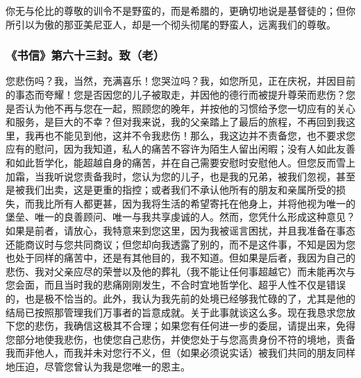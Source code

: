 你无与伦比的尊敬的训令不是野蛮的，而是希腊的，更确切地说是基督徒的；但你所引以为傲的那亚美尼亚人，却是一个彻头彻尾的野蛮人，远离我们的尊敬。\par


\subsubsection{《书信》第六十三封。致（老）}

\par

您悲伤吗？我，当然，充满喜乐！您哭泣吗？我，如您所见，正在庆祝，并因目前的事态而夸耀！您是否因您的儿子被取走，并因他的德行而被提升尊荣而悲伤？您是否认为他不再与您在一起，照顾您的晚年，并按他的习惯给予您一切应有的关心和服务，是巨大的不幸？但对我来说，我的父亲踏上了最后的旅程，不再回到我这里，我再也不能见到他，这并不令我悲伤！那么，我这边并不责备您，也不要求您应有的慰问，因为我知道，私人的痛苦不容许为陌生人留出闲暇；没有人如此友善和如此哲学化，能超越自身的痛苦，并在自己需要安慰时安慰他人。但您反而雪上加霜，当我听说您责备我时，您认为您的儿子，也是我的兄弟，被我们忽视，甚至是被我们出卖，这是更重的指控；或者我们不承认他所有的朋友和亲属所受的损失，而我比所有人都更甚，因为我将生活的希望寄托在他身上，并将他视为唯一的堡垒、唯一的良善顾问、唯一与我共享虔诚的人。然而，您凭什么形成这种意见？如果是前者，请放心，我特意来到您这里，因为我被谣言困扰，并且我准备在事态还能商议时与您共同商议；但您却向我透露了别的，而不是这件事，不知是因为您也处于同样的痛苦中，还是有其他目的，我不知道。但如果是后者，我因为自己的悲伤、我对父亲应尽的荣誉以及他的葬礼（我不能让任何事超越它）而未能再次与您会面，而且当时我的悲痛刚刚发生，不合时宜地哲学化、超乎人性不仅是错误的，也是极不恰当的。此外，我认为我先前的处境已经够我忙碌的了，尤其是他的结局已按照那管理我们万事者的旨意成就。关于此事就谈这么多。现在我恳求您放下您的悲伤，我确信这极其不合理；如果您有任何进一步的委屈，请提出来，免得您部分地使我悲伤，也使您自己悲伤，并使您处于与您高贵身份不符的境地，责备我而非他人，而我并未对您行不义，但（如果必须说实话）被我们共同的朋友同样地压迫，尽管您曾认为我是您唯一的恩主。\par

